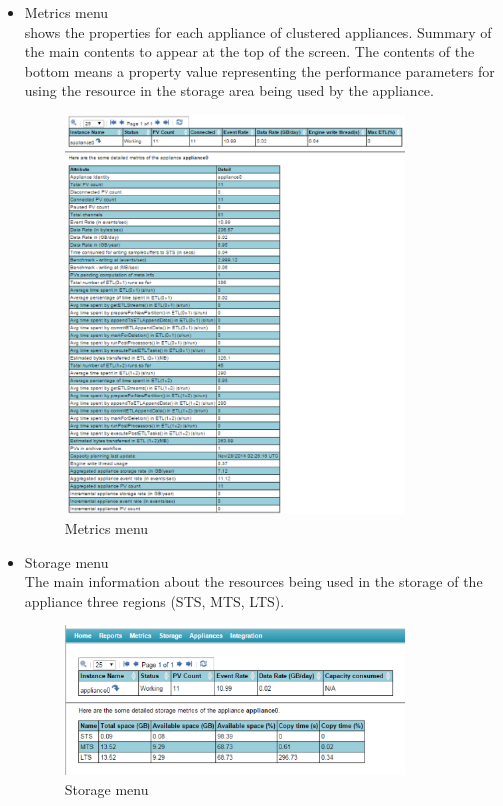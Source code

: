 \documentclass[11pt
  , a4paper
  , article
  , oneside
]{memoir}
\begin{document}
\begin{itemize}
	\item Metrics menu \\
	 shows the properties for each appliance of clustered appliances. Summary of the main contents to appear at the top of the screen. The contents of the bottom means a property value representing the performance parameters for using the resource in the storage area being used by the appliance.
	
	\begin{figure}[h!]
		\centering
		\includegraphics[width=0.85\textwidth, height=0.8\textwidth]{./images/metrics.eps}
		\caption{Metrics menu}

	\end{figure}
	\clearpage
	
	\item Storage menu \\
	The main information about the resources being used in the storage of the appliance three regions (STS, MTS, LTS).
	
	\begin{figure}[h!]
		\centering
		\includegraphics[width=0.85\textwidth, height=0.3\textwidth]{./images/storage.eps}
		\caption{Storage menu}
	\end{figure}
	

\end{itemize}
\end{document}
